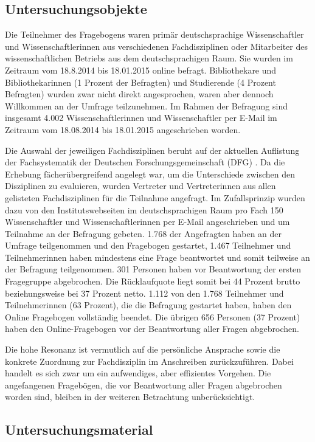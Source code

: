 \subsection{Untersuchungsobjekte}

Die Teilnehmer des Fragebogens waren primär deutschsprachige Wissenschaftler und Wissenschaftlerinnen aus verschiedenen Fachdisziplinen oder Mitarbeiter des wissenschaftlichen Betriebs aus dem deutschsprachigen Raum. Sie wurden im Zeitraum vom 18.8.2014 bis 18.01.2015 online befragt. Bibliothekare und Bibliothekarinnen (1 Prozent der Befragten) und Studierende (4 Prozent Befragten) wurden zwar nicht direkt angesprochen, waren aber dennoch Willkommen an der Umfrage teilzunehmen. Im Rahmen der Befragung sind insgesamt 4.002 Wissenschaftlerinnen und Wissenschaftler per E-Mail im Zeitraum vom 18.08.2014 bis 18.01.2015 angeschrieben worden.

Die Auswahl der jeweiligen Fachdisziplinen beruht auf der aktuellen Auflistung der Fachsystematik der Deutschen Forschungsgemeinschaft (DFG) \cite{suchen_Webseite_DFG}. Da die Erhebung fächerübergreifend angelegt war, um die Unterschiede zwischen den Disziplinen zu evaluieren, wurden Vertreter und Vertreterinnen aus allen gelisteten Fachdisziplinen für die Teilnahme angefragt. Im Zufallsprinzip wurden dazu von den Institutswebseiten im deutschsprachigen Raum pro Fach 150 Wissenschaftler und Wissenschaftlerinnen per E-Mail angeschrieben und um Teilnahme an der Befragung gebeten. 1.768 der Angefragten haben an der Umfrage teilgenommen und den Fragebogen gestartet, 1.467 Teilnehmer und Teilnehmerinnen haben mindestens eine Frage beantwortet und somit teilweise an der Befragung teilgenommen. 301 Personen haben vor Beantwortung der ersten Fragegruppe abgebrochen. Die Rücklaufquote liegt somit bei 44 Prozent brutto beziehungsweise bei 37 Prozent netto. 1.112 von den 1.768 Teilnehmer und Teilnehmerinnen (63 Prozent), die die Befragung gestartet haben, haben den Online Fragebogen vollständig beendet. Die übrigen 656 Personen (37 Prozent) haben den Online-Fragebogen vor der Beantwortung aller Fragen abgebrochen.

Die hohe Resonanz ist vermutlich auf die persönliche Ansprache sowie die konkrete Zuordnung zur Fachdisziplin im Anschreiben zurückzuführen. Dabei handelt es sich zwar um ein aufwendiges, aber effizientes Vorgehen. Die angefangenen Fragebögen, die vor Beantwortung aller Fragen abgebrochen worden sind, bleiben in der weiteren Betrachtung unberücksichtigt.

\subsection{Untersuchungsmaterial}

